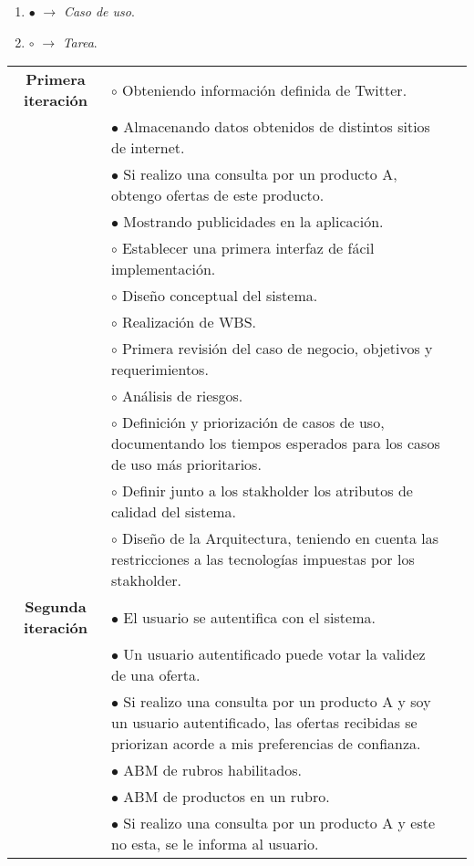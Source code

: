 \begin{enumerate}
	\item $\bullet$ $\rightarrow$ \textit{Caso de uso}.
	\item $\circ$ $\rightarrow$ \textit{Tarea}.
\end{enumerate}

\begin{center}
	\begin{tabular}{| c | p{10cm} | c |}
		\hline
		\textbf{Primera iteración}& $\circ$ Obteniendo información definida de Twitter. &  \\
								  & $\bullet$ Almacenando datos obtenidos de distintos sitios de internet. & \\
								  & $\bullet$ Si realizo una consulta por un producto A, obtengo ofertas de este producto. & \\
								  & $\bullet$ Mostrando publicidades en la aplicación. & \\
								  & $\circ$ Establecer una primera interfaz de fácil implementación. & \\
								  & $\circ$ Diseño conceptual del sistema. & \\ 
								  & $\circ$ Realización de WBS. & \\
								  & $\circ$ Primera revisión del caso de negocio, objetivos y requerimientos. & \\
								  & $\circ$ Análisis de riesgos. & \\
								  & $\circ$ Definición y priorización de casos de uso, documentando los tiempos esperados para los casos de uso más prioritarios. & \\
								  & $\circ$ Definir junto a los stakholder los atributos de calidad del sistema. & \\
								  & $\circ$ Diseño de la Arquitectura, teniendo en cuenta las restricciones a las tecnologías impuestas por los stakholder. & \\

		\hline
		\textbf{Segunda iteración}& $\bullet$ El usuario se autentifica con el sistema. &  \\
								  & $\bullet$ Un usuario autentificado puede votar la validez de una oferta. &  \\
								  & $\bullet$ Si realizo una consulta por un producto A y soy un usuario autentificado, las ofertas recibidas se priorizan acorde a mis preferencias de confianza. & \\
								  & $\bullet$ ABM de rubros habilitados. & \\
								  & $\bullet$ ABM de productos en un rubro. & \\
								  & $\bullet$ Si realizo una consulta por un producto A y este no esta, se le informa al usuario. & \\


\end{tabular}
\end{center}

